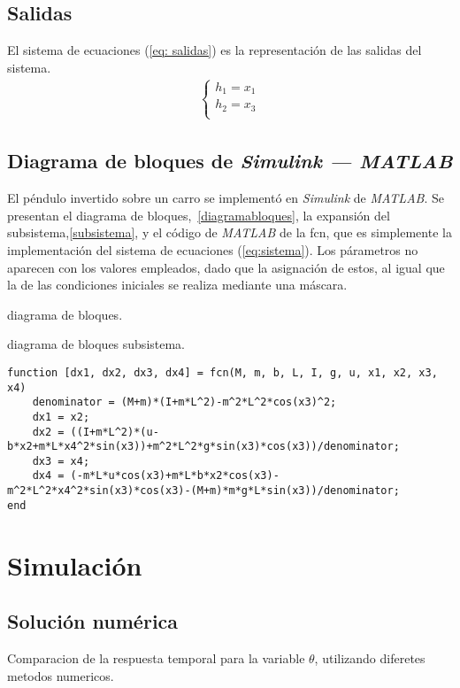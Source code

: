 \documentclass{ieeeaccess}
\begin{document}
\subsection{Salidas}
El sistema de ecuaciones (\ref{eq: salidas}) es la representación de las salidas
del sistema.
\begin{eqnarray}
  \label{eq: salidas}
  \left\{
  \begin{array}{ll}
    h_1=x_1\\
    h_2=x_3\\
  \end{array}
  \right.
\end{eqnarray}

\subsection{Diagrama de bloques de \textit{Simulink --- MATLAB}}

El péndulo invertido sobre un carro se implementó en \textit{Simulink} de
\textit{MATLAB}. Se presentan el diagrama de bloques,~\ref{diagramabloques},
la expansión del subsistema,\ref{subsistema}, y el código de \textit{MATLAB} de
la fcn, que es simplemente la implementación del sistema de ecuaciones
(\ref{eq:sistema}). Los párametros no aparecen con los valores empleados,
dado que la asignación de estos, al igual que la de las condiciones iniciales
se realiza mediante una máscara.


{diagrama de bloques.\label{diagramabloques}}

{diagrama de bloques subsistema.\label{subsistema}}

\lstset{language=Matlab, breaklines=true, basicstyle=\footnotesize}
\lstset{numbers=left, numberstyle=\tiny, stepnumber=1, numbersep=-2pt}
\begin{lstlisting}[frame=single]
function [dx1, dx2, dx3, dx4] = fcn(M, m, b, L, I, g, u, x1, x2, x3, x4)
    denominator = (M+m)*(I+m*L^2)-m^2*L^2*cos(x3)^2;
    dx1 = x2;
    dx2 = ((I+m*L^2)*(u-b*x2+m*L*x4^2*sin(x3))+m^2*L^2*g*sin(x3)*cos(x3))/denominator;
    dx3 = x4;
    dx4 = (-m*L*u*cos(x3)+m*L*b*x2*cos(x3)-m^2*L^2*x4^2*sin(x3)*cos(x3)-(M+m)*m*g*L*sin(x3))/denominator;
end
\end{lstlisting}
\section{Simulación}
\subsection{Solución numérica}
       {Comparacion de la respuesta temporal para la variable $\theta$,
         utilizando diferetes metodos numericos.\label{fig:nmth}}
\end{document}
